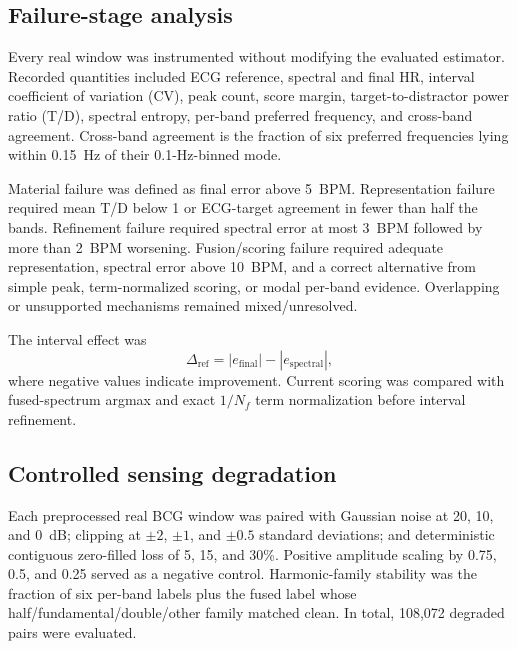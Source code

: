 \documentclass[10pt,twocolumn]{article}
\begin{document}
\subsection{Failure-stage analysis}
Every real window was instrumented without modifying the evaluated estimator. Recorded quantities included ECG reference, spectral and final HR, interval coefficient of variation (CV), peak count, score margin, target-to-distractor power ratio (T/D), spectral entropy, per-band preferred frequency, and cross-band agreement. Cross-band agreement is the fraction of six preferred frequencies lying within 0.15~Hz of their 0.1-Hz-binned mode.

Material failure was defined as final error above 5~BPM. Representation failure required mean T/D below 1 or ECG-target agreement in fewer than half the bands. Refinement failure required spectral error at most 3~BPM followed by more than 2~BPM worsening. Fusion/scoring failure required adequate representation, spectral error above 10~BPM, and a correct alternative from simple peak, term-normalized scoring, or modal per-band evidence. Overlapping or unsupported mechanisms remained mixed/unresolved.

The interval effect was
\begin{equation}
\Delta_{\mathrm{ref}}=|e_{\mathrm{final}}|-|e_{\mathrm{spectral}}|,
\end{equation}
where negative values indicate improvement. Current scoring was compared with fused-spectrum argmax and exact $1/N_f$ term normalization before interval refinement.

\subsection{Controlled sensing degradation}
Each preprocessed real BCG window was paired with Gaussian noise at 20, 10, and 0~dB; clipping at $\pm2$, $\pm1$, and $\pm0.5$ standard deviations; and deterministic contiguous zero-filled loss of 5, 15, and 30\%. Positive amplitude scaling by 0.75, 0.5, and 0.25 served as a negative control. Harmonic-family stability was the fraction of six per-band labels plus the fused label whose half/fundamental/double/other family matched clean. In total, 108,072 degraded pairs were evaluated.
\end{document}
